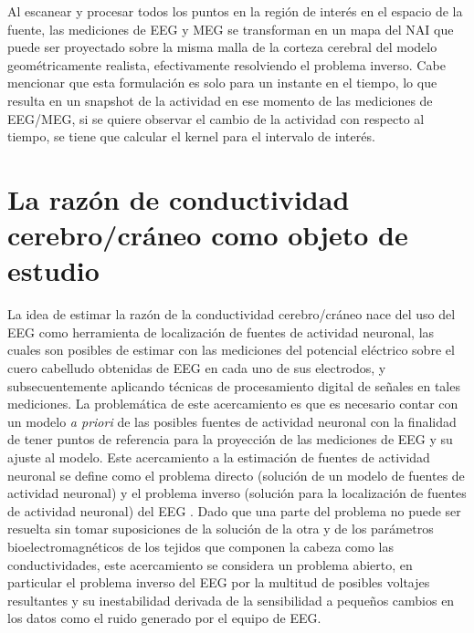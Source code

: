 Al escanear y procesar todos los puntos en la región de interés en el espacio de la fuente, las mediciones de EEG y MEG se transforman en un mapa del NAI que puede ser proyectado sobre la misma malla de la corteza cerebral del modelo geométricamente realista, efectivamente resolviendo el problema inverso. Cabe mencionar que esta formulación es solo para un instante en el tiempo, lo que resulta en un snapshot de la actividad en ese momento de las mediciones de EEG/MEG, si se quiere observar el cambio de la actividad con respecto al tiempo, se tiene que calcular el kernel para el intervalo de interés.

\section{La razón de conductividad cerebro/cráneo como objeto de estudio}
\label{sec:intro:study}

La idea de estimar la razón de la conductividad cerebro/cráneo nace del uso del EEG como herramienta de localización de fuentes de actividad neuronal, las cuales son posibles de estimar con las mediciones del potencial eléctrico sobre el cuero cabelludo obtenidas de EEG en cada uno de sus electrodos, y subsecuentemente aplicando técnicas de procesamiento digital de señales en tales mediciones. La problemática de este acercamiento es que es necesario contar con un modelo \emph{a priori} de las posibles fuentes de actividad neuronal con la finalidad de tener puntos de referencia para la proyección de las mediciones de EEG y su ajuste al modelo. Este acercamiento a la estimación de fuentes de actividad neuronal se define como el problema directo (solución de un modelo de fuentes de actividad neuronal) y el problema inverso (solución para la localización de fuentes de actividad neuronal) del EEG \cite{Grech2008}. Dado que una parte del problema no puede ser resuelta sin tomar suposiciones de la solución de la otra y de los parámetros bioelectromagnéticos de los tejidos que componen la cabeza como las conductividades, este acercamiento se considera un problema abierto, en particular el problema inverso del EEG por la multitud de posibles voltajes resultantes y su inestabilidad derivada de la sensibilidad a pequeños cambios en los datos como el ruido generado por el equipo de EEG. 

